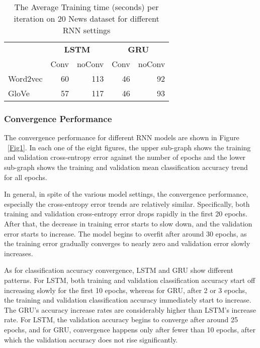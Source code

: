 \documentclass{article}
\begin{document}
\begin{table}
    \begin{tabular}{lrrrr}\toprule
        &\multicolumn{2}{c}{\textbf{LSTM}}&\multicolumn{2}{c}{\textbf{GRU}}
        \\\cmidrule(r){2-3}\cmidrule(r){4-5}
        &Conv&noConv&Conv&noConv\\\midrule
        Word2vec    & 60 & 113 & 46 & 92\\
        GloVe   & 57 & 117 & 46 & 93\\\bottomrule
    \end{tabular}
    \caption{\small The Average Training time (seconds) per iteration on 20 News dataset for different RNN settings}\label{Tab5}
\end{table}


\subsubsection*{Convergence Performance}
The convergence performance for different RNN models are shown in Figure ~\ref{Fig1}. In each one of the eight figures, the upper sub-graph shows the training and validation cross-entropy error against the number of epochs and the lower sub-graph shows the training and validation mean classification accuracy trend for all epochs.

In general, in spite of the various model settings, the convergence performance, especially the cross-entropy error trends are relatively similar. Specifically, both training and validation cross-entropy error drops rapidly in the first 20 epochs. After that, the decrease in training error starts to slow down, and the validation error starts to increase. The model begins to overfit after around 30 epochs, as the training error gradually converges to nearly zero and validation error slowly increases.

As for classification accuracy convergence, LSTM and GRU show different patterns. For LSTM, both training and validation classification accuracy start off increasing slowly for the first 10 epochs, whereas for GRU, after 2 or 3 epochs, the training and validation classification accuracy immediately start to increase. The GRU’s accuracy increase rates are considerably higher than LSTM’s increase rate. For LSTM, the validation accuracy begins to converge after around 25 epochs, and for GRU, convergence happens only after fewer than 10 epochs, after which the validation accuracy does not rise significantly.
\end{document}
